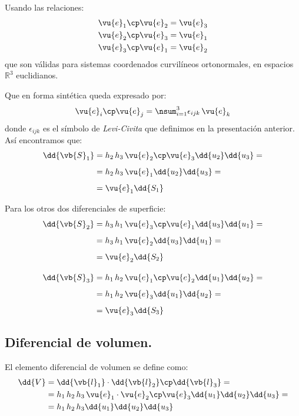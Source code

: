 Usando las relaciones:
\begin{align*}
\vu{e}_{1} \cp \vu{e}_{2} = \vu{e}_{3} \\
\vu{e}_{2} \cp \vu{e}_{3} = \vu{e}_{1} \\
\vu{e}_{3} \cp \vu{e}_{1} = \vu{e}_{2}
\end{align*}
que son válidas para sistemas coordenados curvilíneos ortonormales, en espacios $\mathbb{R}^{3}$ euclidianos.
\par
Que en forma sintética queda expresado por:
\begin{align}
\vu{e}_{i} \cp \vu{e}_{j} = \nsum_{i=1}^{3} \epsilon_{ijk} \, \vu{e}_{k}
\end{align}
donde $\epsilon_{ijk}$ es el símbolo de \emph{Levi-Civita} que definimos en la presentación anterior. Así encontramos que:
\begin{align*}
\dd{\vb{S}_{1}} &= h_{2} \, h_{3} \, \vu{e}_{2} \cp \vu{e}_{3} \dd{u_{2}} \dd{u_{3}} = \\[0.5em]
&= h_{2} \, h_{3} \, \vu{e}_{1} \dd{u_{2}} \dd{u_{3}} = \\[0.5em]
&= \vu{e}_{1} \dd{S_{1}}
\end{align*}

Para los otros dos diferenciales de superficie:
\begin{align*}
\dd{\vb{S}_{2}} &= h_{3} \, h_{1} \, \vu{e}_{3} \cp \vu{e}_{1} \dd{u_{3}} \dd{u_{1}} = \\[0.5em]
&= h_{3} \, h_{1} \, \vu{e}_{2} \dd{u_{3}} \dd{u_{1}} = \\[0.5em]
&= \vu{e}_{2} \dd{S_{2}} \\[1em]
\dd{\vb{S}_{3}} &= h_{1} \, h_{2} \, \vu{e}_{1} \cp \vu{e}_{2} \dd{u_{1}} \dd{u_{2}} = \\[0.5em]
&= h_{1} \, h_{2} \, \vu{e}_{3} \dd{u_{1}} \dd{u_{2}} = \\[0.5em]
&= \vu{e}_{3} \dd{S_{3}}
\end{align*}

\subsection{Diferencial de volumen.}

El elemento diferencial de volumen se define como:
\begin{align*}
\dd{V} &= \dd{\vb{l}_{1}} \cdot \dd{\vb{l}_{2}} \cp \dd{\vb{l}_{3}} = \\
&= h_{1} \, h_{2} \, h_{3} \, \vu{e}_{1} \cdot \vu{e}_{2} \cp \vu{e}_{3} \dd{u_{1}} \dd{u_{2}} \dd{u_{3}} = \\
&= h_{1} \, h_{2} \, h_{3} \dd{u_{1}} \dd{u_{2}} \dd{u_{3}}
\end{align*}

